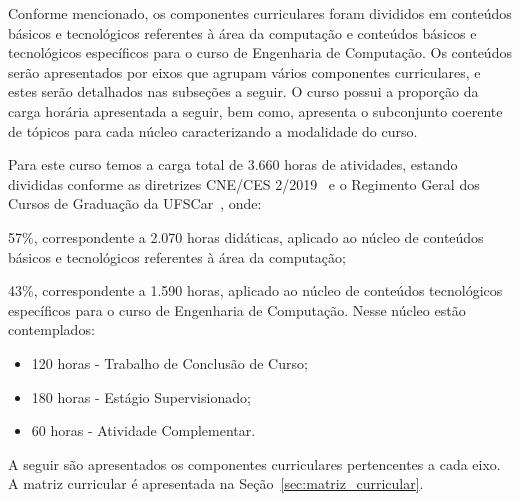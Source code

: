 






Conforme mencionado, os componentes curriculares foram divididos em conteúdos básicos e tecnológicos referentes à área da computação e conteúdos básicos e tecnológicos específicos para o curso de Engenharia de Computação. Os conteúdos serão apresentados por eixos que agrupam vários componentes curriculares, e estes serão detalhados nas subseções a seguir.
O curso possui a proporção da carga horária apresentada a seguir, bem como, apresenta o subconjunto coerente de tópicos para cada núcleo caracterizando a modalidade do curso.

Para este curso temos a carga total de 3.660 horas de atividades, estando divididas conforme as diretrizes CNE/CES 2/2019~\cite{CNE2019} e o Regimento Geral dos Cursos de Graduação da UFSCar~\cite{RGCG}, onde:

\begin{compenum}
    \item 57\%, correspondente a 2.070 horas didáticas, aplicado ao núcleo de conteúdos básicos e tecnológicos referentes à área da computação;
    \item 43\%, correspondente a 1.590 horas, aplicado ao núcleo de conteúdos tecnológicos específicos para o curso de Engenharia de Computação. Nesse núcleo estão contemplados:
    \begin{itemize}
        \item 120 horas - Trabalho de Conclusão de Curso;
        \item 180 horas - Estágio Supervisionado;
        \item  60 horas - Atividade Complementar.
    \end{itemize}
\end{compenum}

A seguir são apresentados os componentes curriculares pertencentes a cada eixo. A matriz curricular é apresentada na Seção~\ref{sec:matriz_curricular}.

